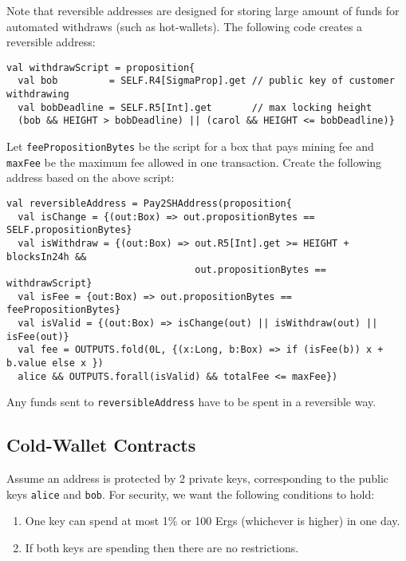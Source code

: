 \documentclass[11pt]{article}
\begin{document}
Note that reversible addresses are designed for storing large amount of funds for automated withdraws (such as hot-wallets). 
The following code creates a reversible address:
\begin{verbatim}
val withdrawScript = proposition{
  val bob         = SELF.R4[SigmaProp].get // public key of customer withdrawing
  val bobDeadline = SELF.R5[Int].get       // max locking height
  (bob && HEIGHT > bobDeadline) || (carol && HEIGHT <= bobDeadline)}
\end{verbatim}

Let \texttt{feePropositionBytes} be the script for a box that pays mining fee and \texttt{maxFee} be the maximum fee allowed in one transaction. 
Create the following address based on the above script:
\begin{verbatim}
val reversibleAddress = Pay2SHAddress(proposition{
  val isChange = {(out:Box) => out.propositionBytes == SELF.propositionBytes}
  val isWithdraw = {(out:Box) => out.R5[Int].get >= HEIGHT + blocksIn24h &&
                                 out.propositionBytes == withdrawScript}
  val isFee = {out:Box) => out.propositionBytes == feePropositionBytes}
  val isValid = {(out:Box) => isChange(out) || isWithdraw(out) || isFee(out)}
  val fee = OUTPUTS.fold(0L, {(x:Long, b:Box) => if (isFee(b)) x + b.value else x })
  alice && OUTPUTS.forall(isValid) && totalFee <= maxFee})
\end{verbatim}

Any funds sent to \texttt{reversibleAddress} have to be spent in a reversible way. 

\subsection{Cold-Wallet Contracts}

Assume an address is protected by 2 private keys, corresponding to the public keys \texttt{alice} and \texttt{bob}. For security, we want the following conditions to hold:

\begin{enumerate}
	\item One key can spend at most 1\% or 100 Ergs (whichever is higher) in one day.
	\item If both keys are spending then there are no restrictions. 
\end{enumerate}
\end{document}
